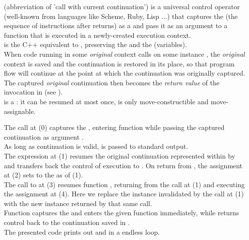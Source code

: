
\cc (abbreviation of 'call with current continuation') is a universal control
operator (well-known from languages like Scheme, Ruby, Lisp ...) that captures
the \currcont (the sequence of instructions after \cc returns) as a
 and pass it as an argument to a function that is
executed in a newly-created execution context.\\

\call is the C++ equivalent to \cc, preserving the  and the
 (variables).\\

When code running in some \emph{original} context calls \contop on some \cont
instance , the \emph{original} context is saved and
the  continuation is restored in its place, so that program flow
will continue at the point at which the  continuation was
originally captured. The captured \emph{original} continuation then becomes
the \emph{return value} of the \call invocation in 
(see ).\\

\cont is a : it can be resumed at most once, is only
move-constructible and move-assignable.

The  call at (0) captures the \currcont, entering function
 while passing the captured continuation as argument .\\
As long as continuation  is valid,  is passed to standard
output.\\
The expression  at (1) resumes the original
continuation represented within  by  and transfers back the
control of execution to . On return from ,
the assignment at (2) sets  to the \currcont as of (1).\\
The call to  at (3)
resumes function , returning from the \op call at (1) and executing
the assignment at (4). Here we replace the \cont instance 
invalidated by the \op call at (1) with the new instance returned by that
same \op call.\\
Function \call captures the \currcont and enters the given function immediately,
while \op returns control back to the continuation saved in .\\
The presented code prints out  and  in a endless loop.\\

